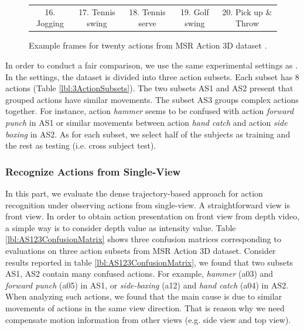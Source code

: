 \documentclass[final,3p,times,twocolumn]{elsarticle}
\begin{document}
\begin{figure}[ht]
{\begin{tabular}{ccccc}
		         16. Jogging &         17. Tennis swing &          18. Tennis serve &          19. Golf swing &          20. Pick up \& Throw \\
		
		\end{tabular}  
		
	}
	\caption{Example frames for twenty actions from MSR Action 3D dataset \cite{li2010action}.}
	\label{Figure_ExampleFrames_MSRAction3D}
\end{figure}

In order to conduct a fair comparison, we use the same experimental settings as \cite{li2010action, yang2012eigenjoints, yang2012recognizing, wang2012mining, xia2013spatio, oreifej2013hon4d}.
In the settings, the dataset is divided into three action subsets. Each subset has 8 actions (Table \ref{lbl:3ActionSubsets}).
The two subsets AS1 and AS2 present that grouped actions have similar movements.
The subset AS3 groups complex actions together.
For instance, action \textit{hammer} seems to be confused with action \textit{forward punch} in AS1 or similar movements between action \textit{hand catch} and action \textit{side boxing} in AS2.
As for each subset, we select half of the subjects as training and the rest as testing (i.e. cross subject test).

\subsubsection{Recognize Actions from Single-View}

In this part, we evaluate the dense trajectory-based approach for action recognition under observing actions from single-view.
A straightforward view is front view.
In order to obtain action presentation on front view from depth video, a simple way is to consider depth value as intensity value.
Table \ref{lbl:AS123ConfusionMatrix} shows three confusion matrices corresponding to evaluations on three action subsets from MSR Action 3D dataset.
Consider results reported in table \ref{lbl:AS123ConfusionMatrix}, we found that two subsets AS1, AS2 contain many confused actions. For example, \textit{hammer} (a03) and \textit{forward punch} (a05) in AS1, or \textit{side-boxing} (a12) and \textit{hand catch} (a04) in AS2.
When analyzing such actions, we found that the main cause is due to similar movements of actions in the same view direction.
That is reason why we need compensate motion information from other views (e.g. side view and top view).
\end{document}
